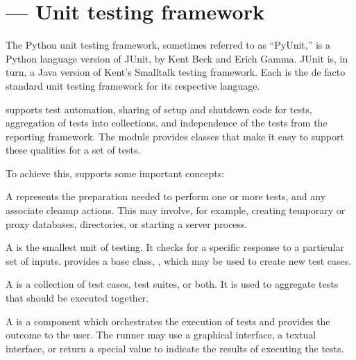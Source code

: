 \section{ ---
         Unit testing framework}



The Python unit testing framework, sometimes referred to as ``PyUnit,'' is
a Python language version of JUnit, by Kent Beck and Erich Gamma.
JUnit is, in turn, a Java version of Kent's Smalltalk testing
framework.  Each is the de facto standard unit testing framework for
its respective language.

 supports test automation, sharing of setup and shutdown
code for tests, aggregation of tests into collections, and independence of
the tests from the reporting framework.  The  module
provides classes that make it easy to support these qualities for a
set of tests.

To achieve this,  supports some important concepts:

\begin{definitions}
A  represents the preparation needed to perform one
or more tests, and any associate cleanup actions.  This may involve,
for example, creating temporary or proxy databases, directories, or
starting a server process.

A  is the smallest unit of testing.  It checks for a
specific response to a particular set of inputs.  
provides a base class, , which may be used to create
new test cases.

A  is a collection of test cases, test suites, or
both.  It is used to aggregate tests that should be executed
together.

A  is a component which orchestrates the execution of
tests and provides the outcome to the user.  The runner may use a
graphical interface, a textual interface, or return a special value to
indicate the results of executing the tests.
\end{definitions}


